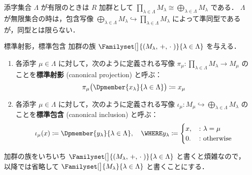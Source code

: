 \documentclass[algtopo_main]{subfiles}
\begin{document}
\begin{marker}
	添字集合 $\Lambda$ が有限のときは $R$ 加群として $\displaystyle\prod_{\lambda \in \Lambda} M_\lambda \cong \bigoplus_{\lambda \in \Lambda} M_\lambda$ である．
	$\Lambda$ が無限集合の時は，包含写像 $\displaystyle\bigoplus_{\lambda \in \Lambda} M_\lambda \hookrightarrow \prod_{\lambda \in \Lambda} M_\lambda$ によって準同型であるが，同型とは限らない．
\end{marker}

\begin{mydef}[label=def:inj-proj]{標準射影，標準包含}
	加群の族 $\Familyset[\big]{(M_\lambda,\, +,\, \cdot\mathrel{})}{\lambda \in \Lambda}$ を与える．
	\begin{enumerate}
		\item 各添字 $\mu \in \Lambda$ に対して，次のように定義される写像 $\pi_\mu \colon \displaystyle\prod_{\lambda \in \Lambda} M_\lambda \to M_\mu$ のことを\textbf{標準射影} (canonical projection) と呼ぶ：
		\begin{align}
			\pi_\mu \bigl( \Dpmember{x_\lambda}{\lambda \in \Lambda} \bigr) \coloneqq x_\mu
		\end{align}
		\item 各添字 $\mu \in \Lambda$ に対して，次のように定義される写像 $\iota_\mu \colon M_\mu \hookrightarrow \displaystyle\bigoplus_{\lambda \in \Lambda} M_\lambda$ のことを\textbf{標準包含} (canonical inclusion) と呼ぶ：
		\begin{align}
			\iota_\mu (x) \coloneqq \Dpmember{y_\lambda}{\lambda \in \Lambda},\quad 
			\WHERE y_\lambda \coloneqq 
			\begin{cases}
				x, &\colon \lambda = \mu \\
				0. &\colon \mathrm{otherwise}
			\end{cases}
		\end{align}
	\end{enumerate}
\end{mydef}

加群の族をいちいち $\Familyset[\big]{(M_\lambda,\, +,\, \cdot\mathrel{})}{\lambda \in \Lambda}$ と書くと煩雑なので，以降では省略して $\Familyset[\big]{M_\lambda}{\lambda\in\Lambda}$ と書くことにする．
\end{document}
